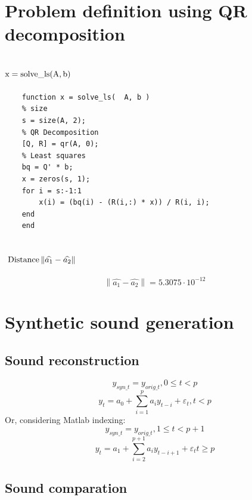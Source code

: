\documentclass[a4paper]{article}
\begin{document}
\section{Problem definition using QR decomposition}
\subsection{$\textup{x}=\textup{solve}\_\textup{ls}(\textup{A},\textup{b})$}

\begin{verbatim} 
	function x = solve_ls(  A, b )
	% size
    s = size(A, 2);
    % QR Decomposition
    [Q, R] = qr(A, 0);  
    % Least squares
    bq = Q' * b;
    x = zeros(s, 1);
    for i = s:-1:1
        x(i) = (bq(i) - (R(i,:) * x)) / R(i, i);
    end
	end
 \end{verbatim}
 \subsection{ $\textup{ Distance} \left \| \widehat{a_{1}} -\widehat{a_{2}} \right \| $}
\[\left \| \widehat{a_{1}} -\widehat{a_{2}} \right \| = 5.3075\cdot 10^{-12}\]

\section{Synthetic sound generation}
\subsection{Sound reconstruction}

\[y_{syn\_t} = y_{orig\_t},    0 \leq t < p\]
\[y_{t} = a_{0} + \sum_{i=1}^{p} a_{i}y_{t-i}+\varepsilon_{t}, t < p\]
%
Or, considering Matlab indexing: 
%
\[y_{syn\_t} = y_{orig\_t},    1 \leq t < p+1\]
\[y_{t} = a_{1} + \sum_{i=2}^{p+1} a_{i}y_{t-i+1}+\varepsilon_{t} t\geq p\]
\subsection{Sound comparation}
\end{document}
